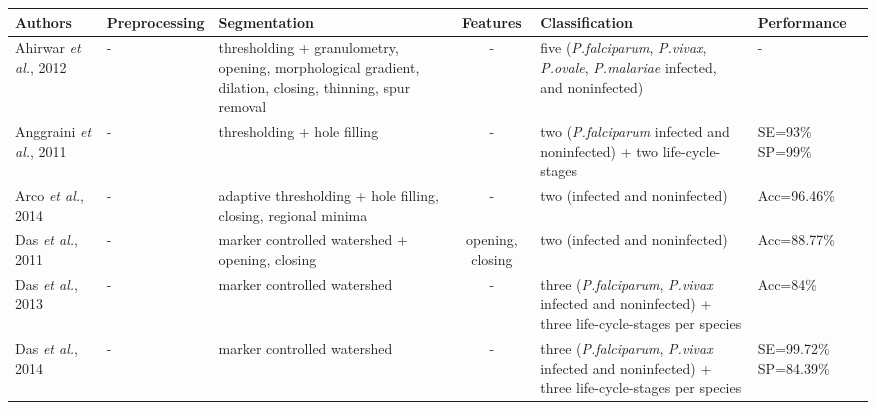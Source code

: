 \footnotesize
{}
    \begin{longtable}{C{2.1cm} C{2.1cm} C{2.3cm} H C{2.7cm} C{2.2cm} }

		\hline
    	\textbf{Authors} & \textbf{Preprocessing} & \textbf{Segmentation} & \textbf{Features} & \textbf{Classification} & \textbf{Performance}  \\[1pt] \hline

    Ahirwar \emph{et al.}, 2012  &
    	- &
    	thresholding + granulometry, opening, morphological gradient, dilation, closing, thinning, spur removal &
    	- &
    	five (\emph{P.falciparum}, \emph{P.vivax}, \emph{P.ovale}, \emph{P.malariae} infected, and noninfected) &
    	- \vspace{0.6cm} \\

    Anggraini \emph{et al.}, 2011 &
		- &
		thresholding + hole filling &	
		- &
		two (\emph{P.falciparum} infected and noninfected) + two life-cycle-stages &
		SE=93\% SP=99\%
        \vspace{0.6cm}
		\\
    Arco \emph{et al.}, 2014 &
		- &
		adaptive thresholding + hole filling, closing, regional minima &	
		- &
		two (infected and noninfected) &
		Acc=96.46\%
		\vspace{0.6cm}
        \\
    Das \emph{et al.}, 2011 &
		- &
		marker controlled watershed + opening, closing &	
		opening, closing  &
		two (infected and noninfected) &
		Acc=88.77\%
		\vspace{0.6cm}
        \\

    Das \emph{et al.}, 2013 &
		- &
		marker controlled watershed &	
		- &
	three (\emph{P.falciparum}, \emph{P.vivax} infected and noninfected) + three life-cycle-stages per species &
		Acc=84\%
		\vspace{0.6cm}
        \\

    Das \emph{et al.}, 2014 &
		- &
		marker controlled watershed &	
		- &
	three (\emph{P.falciparum}, \emph{P.vivax} infected and noninfected) + three life-cycle-stages per species &
		SE=99.72\% SP=84.39\%
		\vspace{0.6cm}
        \\


\end{longtable}
